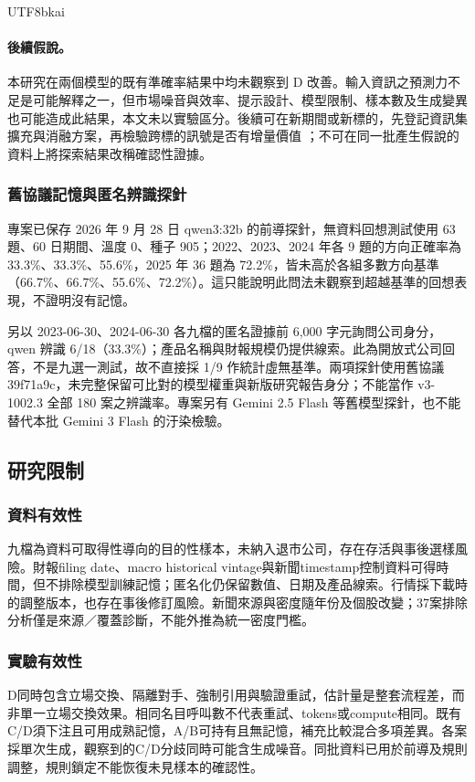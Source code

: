 \documentclass[12pt,a4paper]{article}
\newcommand{\grp}[1]{\textsf{#1}}
\begin{document}
\begin{CJK}{UTF8}{bkai}
\paragraph{後續假說。} 本研究在兩個模型的既有準確率結果中均未觀察到 \grp{D} 改善。輸入資訊之預測力不足是可能解釋之一，但市場噪音與效率、提示設計、模型限制、樣本數及生成變異也可能造成此結果，本文未以實驗區分。後續可在新期間或新標的，先登記資訊集擴充與消融方案，再檢驗跨標的訊號是否有增量價值 \citep{nosek2018prereg}；不可在同一批產生假說的資料上將探索結果改稱確認性證據。
\subsubsection{舊協議記憶與匿名辨識探針}
\label{sec:memorydiagnostic}

專案已保存 2026 年 9 月 28 日 qwen3:32b 的前導探針，無資料回想測試使用 63 題、60 日期間、溫度 0、種子 905；2022、2023、2024 年各 9 題的方向正確率為 33.3\%、33.3\%、55.6\%，2025 年 36 題為 72.2\%，皆未高於各組多數方向基準（66.7\%、66.7\%、55.6\%、72.2\%）。這只能說明此問法未觀察到超越基準的回想表現，不證明沒有記憶。

另以 2023-06-30、2024-06-30 各九檔的匿名證據前 6,000 字元詢問公司身分，qwen 辨識 6/18（33.3\%）；產品名稱與財報規模仍提供線索。此為開放式公司回答，不是九選一測試，故不直接採 1/9 作統計虛無基準。兩項探針使用舊協議 39f71a9c，未完整保留可比對的模型權重與新版研究報告身分；不能當作 v3-1002.3 全部 180 案之辨識率。專案另有 Gemini 2.5 Flash 等舊模型探針，也不能替代本批 Gemini 3 Flash 的汙染檢驗。


\subsection{研究限制}

\subsubsection{資料有效性}
九檔為資料可取得性導向的目的性樣本，未納入退市公司，存在存活與事後選樣風險。財報filing date、macro historical vintage與新聞timestamp控制資料可得時間，但不排除模型訓練記憶；匿名化仍保留數值、日期及產品線索。行情採下載時的調整版本，也存在事後修訂風險。新聞來源與密度隨年份及個股改變；37案排除分析僅是來源／覆蓋診斷，不能外推為統一密度門檻。

\subsubsection{實驗有效性}
D同時包含立場交換、隔離對手、強制引用與驗證重試，估計量是整套流程差，而非單一立場交換效果。相同名目呼叫數不代表重試、tokens或compute相同。既有C/D須下注且可用成熟記憶，A/B可持有且無記憶，補充比較混合多項差異。各案採單次生成，觀察到的C/D分歧同時可能含生成噪音。同批資料已用於前導及規則調整，規則鎖定不能恢復未見樣本的確認性。


\end{CJK}
\end{document}
